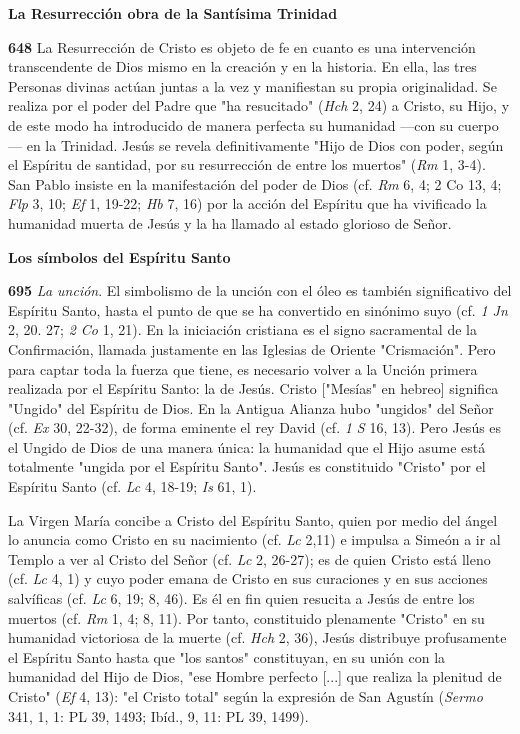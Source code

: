 \documentclass[]{article}
\begin{document}
\textbf{La Resurrección obra de la Santísima Trinidad}

\textbf{648} La Resurrección de Cristo es objeto de fe en cuanto es una
intervención transcendente de Dios mismo en la creación y en la
historia. En ella, las tres Personas divinas actúan juntas a la vez y
manifiestan su propia originalidad. Se realiza por el poder del Padre
que "ha resucitado" (\emph{Hch} 2, 24) a Cristo, su Hijo, y de este modo
ha introducido de manera perfecta su humanidad ---con su cuerpo--- en la
Trinidad. Jesús se revela definitivamente "Hijo de Dios con poder, según
el Espíritu de santidad, por su resurrección de entre los muertos"
(\emph{Rm} 1, 3-4). San Pablo insiste en la manifestación del poder de
Dios (cf. \emph{Rm} 6, 4; 2 Co 13, 4; \emph{Flp} 3, 10; \emph{Ef} 1,
19-22; \emph{Hb} 7, 16) por la acción del Espíritu que ha vivificado la
humanidad muerta de Jesús y la ha llamado al estado glorioso de Señor.

\textbf{Los símbolos del Espíritu Santo}

\textbf{695} \emph{La unción}. El simbolismo de la unción con el óleo es
también significativo del Espíritu Santo, hasta el punto de que se ha
convertido en sinónimo suyo (cf. \emph{1 Jn} 2, 20. 27; \emph{2 Co} 1,
21). En la iniciación cristiana es el signo sacramental de la
Confirmación, llamada justamente en las Iglesias de Oriente
"Crismación". Pero para captar toda la fuerza que tiene, es necesario
volver a la Unción primera realizada por el Espíritu Santo: la de Jesús.
Cristo {[}"Mesías" en hebreo{]} significa "Ungido" del Espíritu de Dios.
En la Antigua Alianza hubo "ungidos" del Señor (cf. \emph{Ex} 30,
22-32), de forma eminente el rey David (cf. \emph{1 S} 16, 13). Pero
Jesús es el Ungido de Dios de una manera única: la humanidad que el Hijo
asume está totalmente "ungida por el Espíritu Santo". Jesús es
constituido "Cristo" por el Espíritu Santo (cf. \emph{Lc} 4, 18-19;
\emph{Is} 61, 1).

La Virgen María concibe a Cristo del Espíritu Santo, quien por medio del
ángel lo anuncia como Cristo en su nacimiento (cf. \emph{Lc} 2,11) e
impulsa a Simeón a ir al Templo a ver al Cristo del Señor (cf. \emph{Lc}
2, 26-27); es de quien Cristo está lleno (cf. \emph{Lc} 4, 1) y cuyo
poder emana de Cristo en sus curaciones y en sus acciones salvíficas
(cf. \emph{Lc} 6, 19; 8, 46). Es él en fin quien resucita a Jesús de
entre los muertos (cf. \emph{Rm} 1, 4; 8, 11). Por tanto, constituido
plenamente "Cristo" en su humanidad victoriosa de la muerte (cf.
\emph{Hch} 2, 36), Jesús distribuye profusamente el Espíritu Santo hasta
que "los santos" constituyan, en su unión con la humanidad del Hijo de
Dios, "ese Hombre perfecto {[}...{]} que realiza la plenitud de Cristo"
(\emph{Ef} 4, 13): "el Cristo total" según la expresión de San Agustín
(\emph{Sermo} 341, 1, 1: PL 39, 1493; Ibíd., 9, 11: PL 39, 1499).
\end{document}
